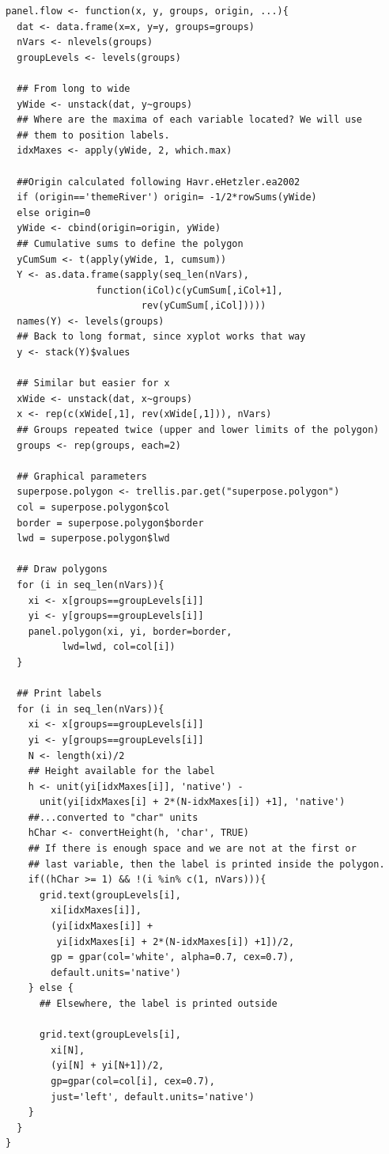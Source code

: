 \lstset{language=R,numbers=none}
\begin{lstlisting}
panel.flow <- function(x, y, groups, origin, ...){
  dat <- data.frame(x=x, y=y, groups=groups)
  nVars <- nlevels(groups)
  groupLevels <- levels(groups)

  ## From long to wide
  yWide <- unstack(dat, y~groups)
  ## Where are the maxima of each variable located? We will use
  ## them to position labels.
  idxMaxes <- apply(yWide, 2, which.max)

  ##Origin calculated following Havr.eHetzler.ea2002
  if (origin=='themeRiver') origin= -1/2*rowSums(yWide)
  else origin=0 
  yWide <- cbind(origin=origin, yWide)
  ## Cumulative sums to define the polygon
  yCumSum <- t(apply(yWide, 1, cumsum))
  Y <- as.data.frame(sapply(seq_len(nVars),
			    function(iCol)c(yCumSum[,iCol+1],
					    rev(yCumSum[,iCol]))))
  names(Y) <- levels(groups)
  ## Back to long format, since xyplot works that way
  y <- stack(Y)$values

  ## Similar but easier for x
  xWide <- unstack(dat, x~groups)
  x <- rep(c(xWide[,1], rev(xWide[,1])), nVars)
  ## Groups repeated twice (upper and lower limits of the polygon)
  groups <- rep(groups, each=2)

  ## Graphical parameters
  superpose.polygon <- trellis.par.get("superpose.polygon")
  col = superpose.polygon$col
  border = superpose.polygon$border 
  lwd = superpose.polygon$lwd 

  ## Draw polygons
  for (i in seq_len(nVars)){
    xi <- x[groups==groupLevels[i]]
    yi <- y[groups==groupLevels[i]]
    panel.polygon(xi, yi, border=border,
		  lwd=lwd, col=col[i])
  }

  ## Print labels
  for (i in seq_len(nVars)){
    xi <- x[groups==groupLevels[i]]
    yi <- y[groups==groupLevels[i]]
    N <- length(xi)/2
    ## Height available for the label
    h <- unit(yi[idxMaxes[i]], 'native') -
      unit(yi[idxMaxes[i] + 2*(N-idxMaxes[i]) +1], 'native')
    ##...converted to "char" units
    hChar <- convertHeight(h, 'char', TRUE)
    ## If there is enough space and we are not at the first or
    ## last variable, then the label is printed inside the polygon.
    if((hChar >= 1) && !(i %in% c(1, nVars))){
      grid.text(groupLevels[i],
		xi[idxMaxes[i]],
		(yi[idxMaxes[i]] +
		 yi[idxMaxes[i] + 2*(N-idxMaxes[i]) +1])/2,
		gp = gpar(col='white', alpha=0.7, cex=0.7),
		default.units='native')
    } else {
      ## Elsewhere, the label is printed outside

      grid.text(groupLevels[i],
		xi[N],
		(yi[N] + yi[N+1])/2,
		gp=gpar(col=col[i], cex=0.7),
		just='left', default.units='native')
    }          
  }
}
\end{lstlisting}


